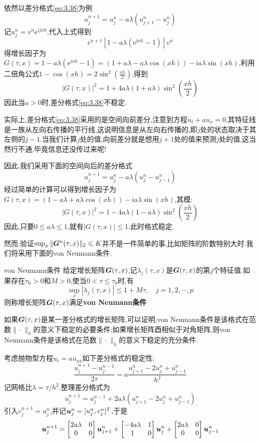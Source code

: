 依然以差分格式\eqref{eq:3.38}为例
$$
u^{n+1}_j=u^n_j-a\lambda(u^n_{j+1}-u^n_j)
$$
记$u^n_j=v^n\mathrm{e}^{\mathrm{i}jxh}$,代入上式得到
$$
v^{n+1}\left[1-a\lambda(\mathrm{e}^{\mathrm{i}xh}-1)\right]v^n
$$
得增长因子为$G(\tau,x)=1-a\lambda(\mathrm{e}^{\mathrm{i}xh}-1)=(1+a\lambda-a\lambda\cos(xh))-\mathrm{i}a\lambda\sin(xh)$,利用二倍角公式$1-\cos(xh)=2\sin^2(\frac{xh}{2})$,得到
$$
|G(\tau,x)|^2=1+4a\lambda(1+a\lambda)\sin^2(\frac{xh}{2})
$$
因此当$a>0$时,差分格式\eqref{eq:3.38}不稳定.\par
实际上,差分格式\eqref{eq:3.38}采用的是空间向前差分,注意到方程$u_t+au_x=0$,其特征线是一族从左向右传播的平行线,这说明信息是从左向右传播的,即$j$处的状态取决于其左侧的$j-1$.当我们计算$j$处的值,向前差分就是想用$j+1$处的值来预测$j$处的值,这当然行不通,毕竟信息还没传过来呢!\par
因此,我们采用下面的空间向后的差分格式
$$
u^{n+1}_j=u^n_j-a\lambda(u^n_{j}-u^n_{j-1})
$$
经过简单的计算可以得到增长因子为$G(\tau,x)=(1-a\lambda+a\lambda\cos(xh))-\mathrm{i}a\lambda\sin(xh)$,其模:
$$
|G(\tau,x)|^2=1-4a\lambda(1-a\lambda)\sin^2(\frac{xh}{2})
$$
因此,只要$0\leqslant a\lambda\leqslant 1$,就有$|G(\tau,x)|\leqslant 1$.此时格式稳定.\par
然而,验证$\sup_{x}\|\bm{G}^n(\tau,x)\|_2\leqslant K$并不是一件简单的事,比如矩阵的阶数特别大时.我们将采用下面的von Neumann条件.
\begin{Definition}{von Neumann条件}
    给定增长矩阵$\bm{G}(\tau,x)$,记$\lambda_j(\tau,x)$是$\bm{G}(\tau,x)$的第$j$个特征值.如果存在$\tau_0>0$和$M>0$,使当$0<\tau\leqslant \tau_0$时,有
    $$
    \sup_{x}|\lambda_j(\tau,x)|\leqslant 1+M\tau,\quad j=1,2,\cdots,p
    $$
    则称增长矩阵$\bm{G}(\tau,x)$满足\textbf{von Neumann条件}
\end{Definition}
如果$\bm{G}(\tau,x)$是某一差分格式的增长矩阵,可以证明,von Neumann条件是该格式在范数$\|\cdot\|_h$的意义下稳定的必要条件;如果增长矩阵酉相似于对角矩阵,则von Neumann条件是该格式在范数$\|\cdot\|_h$的意义下稳定的充分条件.\par
考虑抛物型方程$u_t=au_{xx}$如下差分格式的稳定性:
$$
\frac{u^{n+1}_j-u^{n-1}_j}{2\tau}=a\frac{u^{n}_{j+1}-2u^n_j+u^n_{j-1}}{h^2}
$$
\qquad 记网格比$\lambda=\tau/h^2$.整理差分格式为
$$
u^{n+1}_j=u^{n-1}_j+2a\lambda(u^{n}_{j+1}-2u^n_j+u^n_{j-1})
$$
引入$v^{n+1}_j=u^n_j$,并记$\bm{u}^n_j=[u^n_j,v^n_j]^T$,于是
$$
\bm{u}^{n+1}_j=
\begin{bmatrix}
    2a\lambda & 0\\
    0 & 0\\
\end{bmatrix}
\bm{u}^n_{j+1}+
\begin{bmatrix}
    -4a\lambda & 1\\
    1 & 0\\
\end{bmatrix}
\bm{u}^n_j+
\begin{bmatrix}
    2a\lambda & 0\\
    0 & 0\\
\end{bmatrix}
\bm{u}^n_{j-1}
$$
